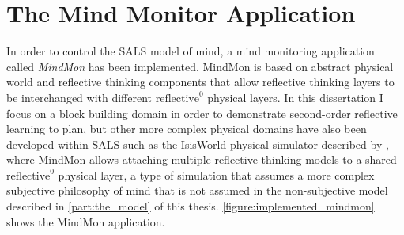 \chapter{The Mind Monitor Application}
\label{chapter:the_mind_monitor_application}

In order to control the SALS model of mind, a mind monitoring
application called \emph{MindMon} has been implemented.  MindMon is
based on abstract physical world and reflective thinking components
that allow reflective thinking layers to be interchanged with
different $\text{reflective}^0$ physical layers.  In this dissertation
I focus on a block building domain in order to demonstrate
second-order reflective learning to plan, but other more complex
physical domains have also been developed within SALS such as the
IsisWorld physical simulator described by \cite{smith:2010}, where
MindMon allows attaching multiple reflective thinking models to a
shared $\text{reflective}^0$ physical layer, a type of simulation that
assumes a more complex subjective philosophy of mind that is not
assumed in the non-subjective model described in
{\mbox{\autoref{part:the_model}}} of this thesis.
{\mbox{\autoref{figure:implemented_mindmon}}} shows the MindMon
application.

